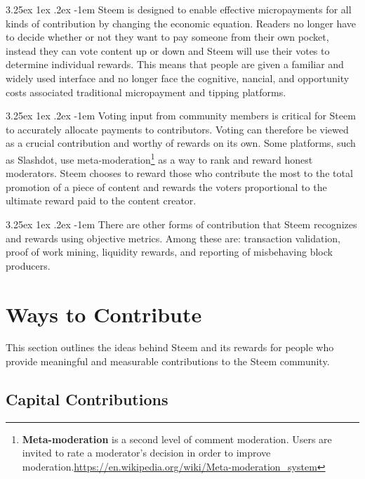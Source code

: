 \documentclass{article}
\makeatletter
\renewcommand\paragraph{\@startsection{paragraph}{5}{\z@}%
  {3.25ex \@plus1ex \@minus.2ex}%
  {-1em}%
  {\normalfont\normalsize\bfseries}}
\makeatother
\begin{document}
			\paragraph{}
				Steem is designed to enable effective micropayments for all kinds of contribution by changing the economic equation. Readers no longer have to decide whether or not they want to pay someone from their own pocket, instead they can vote content up or down and Steem will use their votes to determine individual rewards. This means that people are given a familiar and widely used interface and no longer face the cognitive,  nancial, and opportunity costs associated traditional micropayment and tipping platforms.

			\paragraph{}
				Voting input from community members is critical for Steem to accurately allocate payments to contributors. Voting can therefore be viewed as a crucial contribution and worthy of rewards on its own. Some platforms, such as Slashdot, use meta-moderation\footnote{\textbf{Meta-moderation} is a second level of comment moderation. Users are invited to rate a moderator's decision in order to improve moderation.\newline\url{https://en.wikipedia.org/wiki/Meta-moderation_system}} as a way to rank and reward honest moderators. Steem chooses to reward those who contribute the most to the total promotion of a piece of content and rewards the voters proportional to the ultimate reward paid to the content creator.

			\paragraph{}
				There are other forms of contribution that Steem recognizes and rewards using objective metrics. Among these are: transaction validation, proof of work mining, liquidity rewards, and reporting of misbehaving block producers.

	\section{Ways to Contribute}

		This section outlines the ideas behind Steem and its rewards for people who provide meaningful and measurable contributions to the Steem community.

		\subsection{Capital Contributions}
\end{document}

